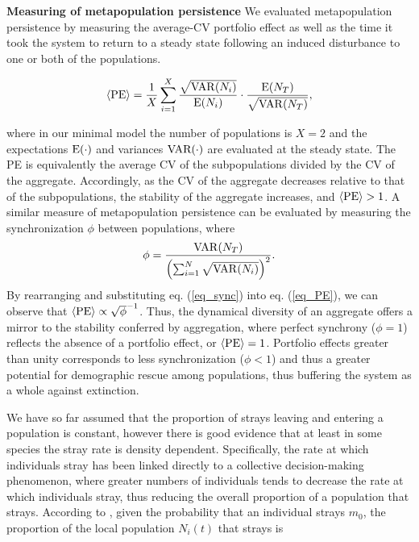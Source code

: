 \documentclass[twocolumn,preprintnumbers,amsmath,amssymb,superscriptaddress]{revtex4}
\begin{document}
{\bf Measuring of metapopulation persistence}
We evaluated metapopulation persistence by measuring the average-CV portfolio effect as well as the time it took the system to return to a steady state following an induced disturbance to one or both of the populations.


\begin{equation}
\langle{\rm PE}\rangle =\frac{1}{X}\sum_{i=1}^{X} \frac{\sqrt{{\rm VAR}(N_i)}}{{\rm E}(N_i)}\cdot \frac{{\rm E}(N_T)}{\sqrt{{\rm VAR}(N_T)}},
\label{eq:pe}
\end{equation}

\noindent where in our minimal model the number of populations is $X=2$ and the expectations $\rm E(\cdot)$ and variances $\rm VAR(\cdot)$ are evaluated at the steady state.
The PE is equivalently the average CV of the subpopulations divided by the CV of the aggregate.
Accordingly, as the CV of the aggregate decreases relative to that of the subpopulations, the stability of the aggregate increases, and $\langle{\rm PE}\rangle > 1$.
A similar measure of metapopulation persistence can be evaluated by measuring the synchronization $\phi$ between populations, where 
\begin{equation}
\label{eq_sync}
\phi = \frac{{\rm VAR}(N_T)}{\left(\sum_{i=1}^N\sqrt{{\rm VAR}(N_i)}\right)^2}.
\end{equation}
By rearranging and substituting eq. (\ref{eq_sync}) into eq. (\ref{eq_PE}), we can observe that $\langle{\rm PE}\rangle \propto \sqrt{\phi}^{-1}$.
Thus, the dynamical diversity of an aggregate offers a mirror to the stability conferred by aggregation, where perfect synchrony ($\phi = 1$) reflects the absence of a portfolio effect, or $\langle{\rm PE}\rangle = 1$.
Portfolio effects greater than unity corresponds to less synchronization ($\phi < 1$) \cite{Loreau:2008ju,Anderson:2014cx,Yeakel:2013vz} and thus a greater potential for demographic rescue among populations, thus buffering the system as a whole against extinction. 




We have so far assumed that the proportion of strays leaving and entering a population is constant, however there is good evidence that at least in some species the stray rate is density dependent.
Specifically, the rate at which individuals stray has been linked directly to a collective decision-making phenomenon, where greater numbers of individuals tends to decrease the rate at which individuals stray, thus reducing the overall proportion of a population that strays.
According to \citeauthor{Berdahl:2016dx}, given the probability that an individual strays $m_0$, the proportion of the local population $N_i(t)$ that strays is
\end{document}

